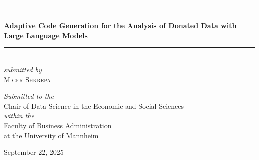 %
%
%
% 
%


\begin{titlepage} %
\newcommand{\HRule}{\rule{\linewidth}{0.5mm}} %
\center %
\textsc{\LARGE \TypeofThesis}\\[1.5cm] %
\HRule\\[0.4cm]
\linespread{1.7}\selectfont
{\huge\bfseries Adaptive Code Generation for the Analysis of
Donated Data with Large Language Models}\\ %
\HRule\\[1.5cm]
\linespread{1.2}\selectfont
    \vfill
    \textit{\large submitted by}\\[0.5cm] %
\textsc{\Large Miger Shkrepa}\\[0.5cm] %
    \vfill

{\large\textit{Submitted to the}}\\
\Large Chair of Data Science in the Economic and Social Sciences \\
    {\large\textit{within the}}\\
    Faculty of Business Administration \\
    at the University of Mannheim
    
\vfill\vfill\vfill %
{\large September 22, 2025} %


\end{titlepage}
